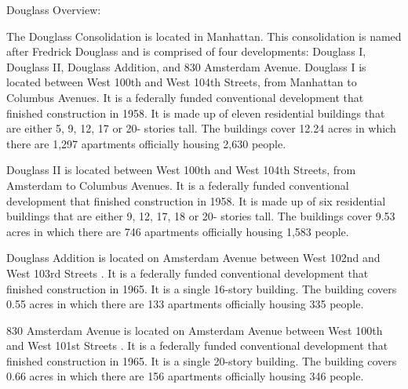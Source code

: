Douglass Overview:    

  

The Douglass Consolidation is located in Manhattan. This consolidation is named after Fredrick Douglass and is comprised of four developments: Douglass I, Douglass II, Douglass Addition, and 830 Amsterdam Avenue. Douglass I is located between West 100th and West 104th Streets, from Manhattan to Columbus Avenues. It is a federally funded conventional development that finished construction in 1958. It is made up of eleven residential buildings that are either 5, 9, 12, 17 or 20- stories tall. The buildings cover 12.24 acres in which there are 1,297 apartments officially housing 2,630 people.     



Douglass II is located between West 100th and West 104th Streets, from Amsterdam to Columbus Avenues. It is a federally funded conventional development that finished construction in 1958. It is made up of six residential buildings that are either 9, 12, 17, 18 or 20- stories tall. The buildings cover 9.53 acres in which there are 746 apartments officially housing 1,583 people.     

    

Douglass Addition is located on Amsterdam Avenue between West 102nd and West 103rd Streets . It is a federally funded conventional development that finished construction in 1965. It is a single 16-story building. The building covers 0.55 acres in which there are 133 apartments officially housing 335 people.     

 

830 Amsterdam Avenue is located on Amsterdam Avenue between West 100th and West 101st Streets . It is a federally funded conventional development that finished construction in 1965. It is a single 20-story building. The building covers 0.66 acres in which there are 156 apartments officially housing 346 people.